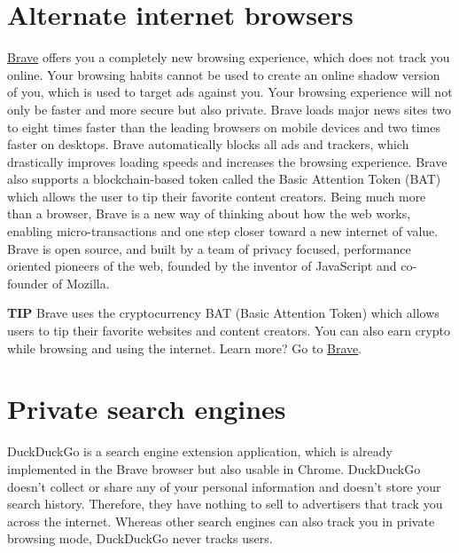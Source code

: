 \section{Alternate internet browsers}
\href{https://brave.com/urm569}{Brave} offers you a completely new browsing experience, which does not track you online. Your browsing habits cannot be used to create an online shadow version of you, which is used to target ads against you. Your browsing experience will not only be faster and more secure but also private. Brave loads major news sites two to eight times faster than the leading browsers on mobile devices and two times faster on desktops. Brave automatically blocks all ads and trackers, which drastically improves loading speeds and increases the browsing experience. Brave also supports a blockchain-based token called the Basic Attention Token (BAT) which allows the user to tip their favorite content creators. Being much more than a browser, Brave is a new way of thinking about how the web works, enabling micro-transactions and one step closer toward a new internet of value. Brave is open source, and built by a team of privacy focused, performance oriented pioneers of the web, founded by the inventor of JavaScript and co-founder of Mozilla.

\begin{quotation}
       \textit{}
\end{quotation}

    \begin{tipbox}{\textbf{TIP}}
        Brave uses the cryptocurrency BAT (Basic Attention Token) which allows users to tip their favorite websites and content creators. You can also earn crypto while browsing and using the internet. 
        \tcblower
        Learn more? Go to \href{https://brave.com/urm569}{Brave}.
    \end{tipbox}

\section{Private search engines}
DuckDuckGo is a search engine extension application, which is already implemented in the Brave browser but also usable in Chrome. DuckDuckGo doesn't collect or share any of your personal information and doesn't store your search history. Therefore, they have nothing to sell to advertisers that track you across the internet. Whereas other search engines can also track you in private browsing mode, DuckDuckGo never tracks users.


